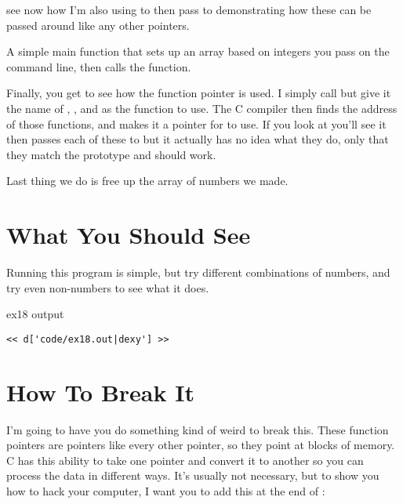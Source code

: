 \begin{description}
    see now how I'm also using  to then pass to 
    demonstrating how these can be passed around like any other pointers.
\item[ex18.c:90-103] A simple main function that sets up an array based on integers
    you pass on the command line, then calls the  function.
\item[ex18.c:105-107] Finally, you get to see how the  function
    pointer  is used.  I simply call  but
    give it the name of , , and 
     as the function to use.  The C compiler then finds
    the address of those functions, and makes it a pointer for 
     to use.  If you look at  you'll
    see it then passes each of these to  but it actually
    has no idea what they do, only that they match the  
    prototype and should work.
\item[ex18.c:109] Last thing we do is free up the array of numbers we made.
\end{description}


\section{What You Should See}

Running this program is simple, but try different combinations of numbers, and
try even non-numbers to see what it does.

\begin{code}{ex18 output}
\begin{lstlisting}
<< d['code/ex18.out|dexy'] >>
\end{lstlisting}
\end{code}


\section{How To Break It}

I'm going to have you do something kind of weird to break this.  These function
pointers are pointers like every other pointer, so they point at blocks of
memory.  C has this ability to take one pointer and convert it to another so
you can process the data in different ways.  It's usually not necessary, but
to show you how to hack your computer, I want you to add this at the end of
:

